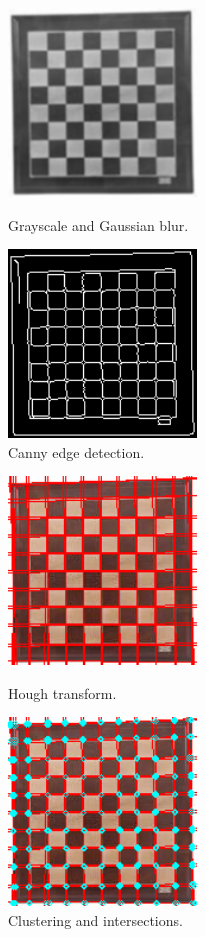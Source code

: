 \documentclass[a4paper,12pt]{article}
\begin{document}
\begin{spacing}{1.3}
\begin{figure}[H]
	\centering
	\begin{minipage}[t]{0.45\textwidth}
		\centering
		\includegraphics[width=5cm]{2.png}
		\caption{Grayscale and Gaussian blur.}
	\end{minipage}
	\begin{minipage}[t]{0.45\textwidth}
		\centering
		\includegraphics[width=5cm]{3.png}
		\caption{Canny edge detection.}
	\end{minipage}
\end{figure}

\begin{figure}[H]
	\centering
	\begin{minipage}[t]{0.45\textwidth}
		\centering
		\includegraphics[width=5cm]{4.png}
		\caption{Hough transform.}
	\end{minipage}
	\begin{minipage}[t]{0.45\textwidth}
		\centering
		\includegraphics[width=5cm]{5.png}
		\caption{Clustering and intersections.}
	\end{minipage}
\end{figure}


\end{spacing}
\end{document}
